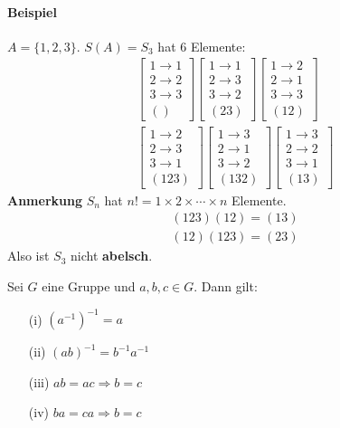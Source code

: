 \documentclass[11pt]{report}
\newcommand*\f[1] {\textbf{#1}}
\begin{document}
\paragraph{Beispiel} $A=\{1, 2, 3\}$. $S(A) = S_3$ hat 6 Elemente:
\begin{align}
\begin{bmatrix} 1 \longrightarrow 1 \\ 2 \longrightarrow 2 \\ 3 \longrightarrow 3 \\ () \end{bmatrix}
\begin{bmatrix} 1 \longrightarrow 1 \\ 2 \longrightarrow 3 \\ 3 \longrightarrow 2 \\ (2 3) \end{bmatrix}
\begin{bmatrix} 1 \longrightarrow 2 \\ 2 \longrightarrow 1 \\ 3 \longrightarrow 3 \\ (1 2) \end{bmatrix} \\
\begin{bmatrix} 1 \longrightarrow 2 \\ 2 \longrightarrow 3 \\ 3 \longrightarrow 1 \\ (1 2 3) \end{bmatrix}
\begin{bmatrix} 1 \longrightarrow 3 \\ 2 \longrightarrow 1 \\ 3 \longrightarrow 2 \\ (1 3 2) \end{bmatrix}
\begin{bmatrix} 1 \longrightarrow 3 \\ 2 \longrightarrow 2 \\ 3 \longrightarrow 1 \\ (1 3) \end{bmatrix}
\end{align}
\f{Anmerkung} $S_n$ hat $n! = 1 \times 2 \times \cdots \times n$ Elemente.
\begin{align}
 (1 2 3)(1 2) = (1 3) \\
 (1 2)(1 2 3) = (2 3)
\end{align}
Also ist $S_3$ nicht \f{abelsch}.

\begin{lemma}
\label{lemma212}
 Sei $G$ eine Gruppe und $a, b, c \in G$. Dann gilt:
\begin{itemize}
 \item[(i)] $(a^{-1})^{-1} = a$
 \item[(ii)] $(ab)^{-1} = b^{-1}a^{-1}$
 \item[(iii)] $ab = ac \Rightarrow b=c$
 \item[(iv)] $ba = ca \Rightarrow b=c$
\end{itemize}
\end{lemma}
\end{document}
